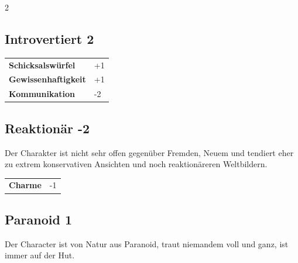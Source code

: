 \begin{multicols}{2}
\begin{tcolorbox}
\end{tcolorbox}

\begin{tcolorbox}
    \subsection*{Introvertiert \hfill \small{2 }}
    \tcblower




\begin{tabular}{@{}ll@{}}
    \textbf{Schicksalswürfel} & +1\\
    \textbf{Gewissenhaftigkeit} & +1\\
    \textbf{Kommunikation} & -2\\
\end{tabular}


\end{tcolorbox}

\begin{tcolorbox}
    \subsection*{Reaktionär \hfill \small{-2 }}
    \tcblower
Der Charakter ist nicht sehr offen gegenüber Fremden, Neuem und tendiert eher zu extrem konservativen Ansichten und noch reaktionäreren Weltbildern.


\vspace{3mm}

\begin{tabular}{@{}ll@{}}
    \textbf{Charme} & -1\\
\end{tabular}


\end{tcolorbox}

\begin{tcolorbox}
    \subsection*{Paranoid \hfill \small{1 }}
    \tcblower
Der Character ist von Natur aus Paranoid, traut niemandem voll und ganz, ist immer auf der Hut.



\end{tcolorbox}
\end{multicols}
